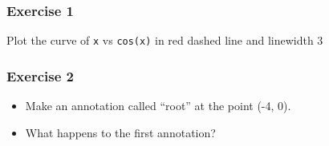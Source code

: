 \documentclass[17pt]{beamer}
\begin{document}
\begin{frame}
\frametitle{Exercise 1}
\label{sec-6}
Plot the curve of \texttt{x} vs \texttt{cos(x)} in red dashed line and linewidth 3
\end{frame}
\begin{frame}
\frametitle{Exercise 2}
\label{sec-9}
\begin{itemize}
\item Make an annotation called ``root'' at the point (-4, 0).
\item What happens to the first annotation?
\end{itemize}
\end{frame}
\end{document}
